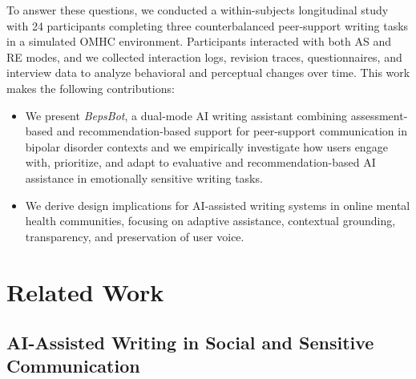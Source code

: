 \documentclass[]{llncs}
\begin{document}
To answer these questions, we conducted a within-subjects longitudinal study with 24 participants completing three counterbalanced peer-support writing tasks in a simulated OMHC environment. Participants interacted with both AS and RE modes, and we collected interaction logs, revision traces, questionnaires, and interview data to analyze behavioral and perceptual changes over time. This work makes the following contributions:
\begin{itemize}
\item We present \textit{BepsBot}, a dual-mode AI writing assistant combining assessment-based and recommendation-based support for peer-support communication in bipolar disorder contexts and we empirically investigate how users engage with, prioritize, and adapt to evaluative and recommendation-based AI assistance in emotionally sensitive writing tasks.
\item We derive design implications for AI-assisted writing systems in online mental health communities, focusing on adaptive assistance, contextual grounding, transparency, and preservation of user voice.
\end{itemize}

\section{Related Work}



\subsection{AI-Assisted Writing in Social and Sensitive Communication}
\end{document}
